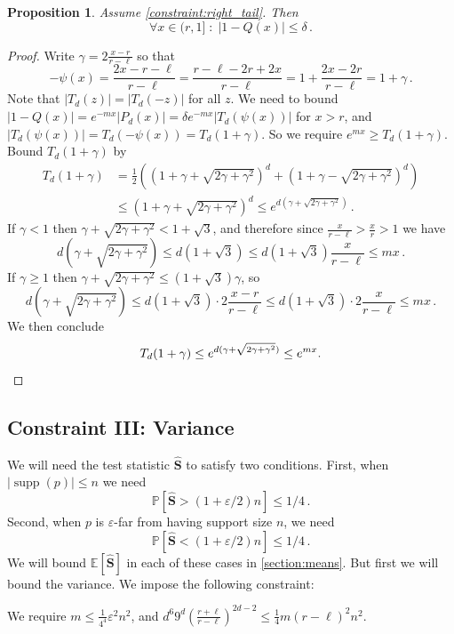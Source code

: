 \documentclass[10pt,a4paper]{article}
\newtheorem{proposition}{Proposition}[section]
\DeclareMathOperator{\supp}{supp}   %
\newcommand{\Ex}[1]{\bE \left[ #1 \right]}
\renewcommand{\Pr}[1]{\bP \left[ #1 \right]} %
\newcommand{\bE}{\ensuremath{\mathbb{E}}}
\newcommand{\bP}{\ensuremath{\mathbb{P}}}
\renewcommand{\epsilon}{\varepsilon}
\begin{document}
\begin{proposition}
\label{res:right_tail}
Assume \cref{constraint:right_tail}. Then 
\[
  \forall x \in (r, 1] \;\colon\; |1 - Q(x)| \leq \delta \,.
\]
\end{proposition}
\begin{proof}
Write $\gamma = 2\frac{x-r}{r-\ell}$ so that
\[
  - \psi(x) =  \frac{2x-r-\ell}{r-\ell}
            = \frac{r-\ell - 2r + 2x}{r-\ell}
            = 1 + \frac{2x-2r}{r-\ell}
            = 1 + \gamma \,.
\]
Note that $|T_d(z)|=|T_d(-z)|$ for all $z$.  We need to bound $|1-Q(x)| = e^{-mx} |P_d(x)| = \delta e^{-mx}
| T_d(\psi(x)) |$ for $x > r$, and $|T_d(\psi(x))| = T_d(-\psi(x)) = T_d(1+\gamma)$.  So we require
$e^{mx} \geq T_d(1 + \gamma)$. Bound $T_d(1+\gamma)$ by
\begin{align*}
T_d(1+\gamma)
&= \frac{1}{2}\left((1 + \gamma + \sqrt{2\gamma + \gamma^2})^d + (1+\gamma - \sqrt{2\gamma +
\gamma^2})^d\right) \\
&\leq (1+\gamma+\sqrt{2\gamma+\gamma^2})^d
\leq e^{d(\gamma+\sqrt{2\gamma+\gamma^2})} \,.
\end{align*}
If $\gamma < 1$ then $\gamma + \sqrt{2\gamma+\gamma^2} < 1 + \sqrt{3}$, and therefore since
$\frac{x}{r-\ell} > \frac{x}{r} > 1$ we have
\[
  d(\gamma + \sqrt{2\gamma + \gamma^2}) \leq d (1+\sqrt{3}) \leq d(1+\sqrt{3}) \frac{x}{r-\ell}
  \leq mx \,.
\]
If $\gamma \geq 1$ then $\gamma + \sqrt{2\gamma+\gamma^2} \leq (1+\sqrt{3})\gamma$, so
\[
  d(\gamma + \sqrt{2\gamma + \gamma^2}) \leq d (1+\sqrt{3}) \cdot 2\frac{x-r}{r-\ell}
    \leq d (1+\sqrt{3}) \cdot 2\frac{x}{r-\ell} \leq mx \,.
\]
We then conclude
\[
  T_d(1+\gamma) \leq e^{d(\gamma + \sqrt{2\gamma + \gamma^2})} \leq e^{mx}. \qedhere
\]
\end{proof}

\subsection{Constraint III: Variance}

We will need the test statistic $\widehat{\bm S}$ to satisfy two conditions.
First, when $|\supp(p)| \leq n$ we need
\[
  \Pr{ \widehat{\bm S} > (1+\epsilon/2)n } \leq 1/4 \,.
\]
Second, when $p$ is $\epsilon$-far from having support size $n$, we need
\[
  \Pr{ \widehat{\bm S} < (1+\epsilon/2)n } \leq 1/4 \,.
\]
We will bound $\Ex{\widehat{\bm S}}$ in each of these cases in \cref{section:means}. But first we
will bound the variance.  We impose the following constraint:

\begin{constraint}
\label{constraint:variance}
We require $m \leq \tfrac{1}{4^4} \epsilon^2 n^2$,
and $d^6 9^d \left(\frac{r+\ell}{r-\ell}\right)^{2d-2} \leq \tfrac{1}{4} m(r-\ell)^2 n^2$.
\end{constraint}
\end{document}

